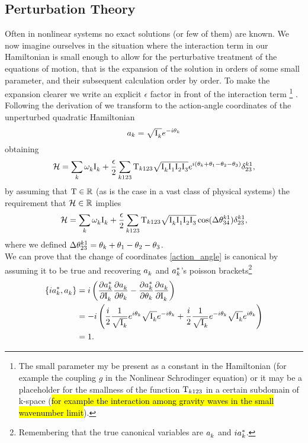\subsection{Perturbation Theory}

Often in nonlinear systems no exact solutions (or few of them) are known. We now imagine ourselves in the situation where the interaction term in our Hamiltonian 
is small enough to allow for the perturbative treatment of the equations of motion, that is the expansion of the solution in orders of some small parameter, 
and their subsequent calculation order by order. To make the expansion clearer we write an explicit $\epsilon$ factor in front of the interaction term
\footnote{The small parameter my be present as a constant in the Hamiltonian (for example the coupling $g$ in the Nonlinear Schrodinger equation) or 
it may be a placeholder for the smallness of the function $\mathrm{T}_{k123}$ in a certain subdomain of k-space (\hl{for example the interaction among gravity waves in 
the small wavenumber limit}). } . \\

Following the derivation of \cite{Onorato2020} we transform to the action-angle coordinates of the unperturbed quadratic Hamiltonian
\begin{equation}
    a_k = \sqrt{\mathrm{I}^{}_k}e^{-i\theta_k}
    \label{action_angle}
\end{equation} 
obtaining 
\begin{equation}
    \mathcal{H} = \sum_k \omega^{}_k \mathrm{I}^{}_k + \frac{\epsilon}{2} \sum_{k123}\mathrm{T}_{k123}\sqrt{\mathrm{I}^{}_k\mathrm{I}^{}_1\mathrm{I}^{}_2\mathrm{I}^{}_3}e^{i(\theta_k + \theta_1 - \theta_2 - \theta_3)}\delta^{k1}_{23},
\end{equation}
by assuming that $\mathrm{T} \in \mathbb{R}$ (as is the case in a vast class of physical systems) the requirement that $\mathcal{H} \in \mathbb{R}$ implies 
\begin{equation}
    \mathcal{H} = \sum_k \omega^{}_k \mathrm{I}^{}_k + \frac{\epsilon}{2} \sum_{k123}\mathrm{T}_{k123}\sqrt{\mathrm{I}^{}_k\mathrm{I}^{}_1\mathrm{I}^{}_2\mathrm{I}^{}_3}\cos(\Delta\theta^{k1}_{34})\delta^{k1}_{23},
\end{equation}
where we defined $\Delta\theta^{k1}_{23}=\theta_k + \theta_1 - \theta_2 - \theta_3$. \\
We can prove that the change of coordinates \eqref{action_angle} is canonical by assuming it to be true and recovering $a_k^{}$ and $a_k^{*}$'s poisson 
brackets\footnote{Remembering that the true canonical variables are $a_k^{}$ and $ia_k^{*}$.} 
\begin{align}
    \left\{ ia_k^{*}, a_k^{} \right\} &= i \left( \frac{\partial a_k^{*}}{\partial \mathrm{I}^{}_k}\frac{\partial a_k^{}}{\partial \theta_k}  -
    \frac{\partial a_k^{*}}{\partial \theta_k}\frac{\partial a_k^{}}{\partial \mathrm{I}^{}_k}  \right) \\
    &= - i \left( \frac{i}{2} \frac{1}{\sqrt{\mathrm{I}^{}_k}}e^{i\theta_k}\sqrt{\mathrm{I}^{}_k}e^{-i\theta_k} + 
    \frac{i}{2} \frac{1}{\sqrt{\mathrm{I}^{}_k}}e^{-i\theta_k}\sqrt{\mathrm{I}^{}_k}e^{i\theta_k}\right) \\
    &= 1 .
\end{align} 

